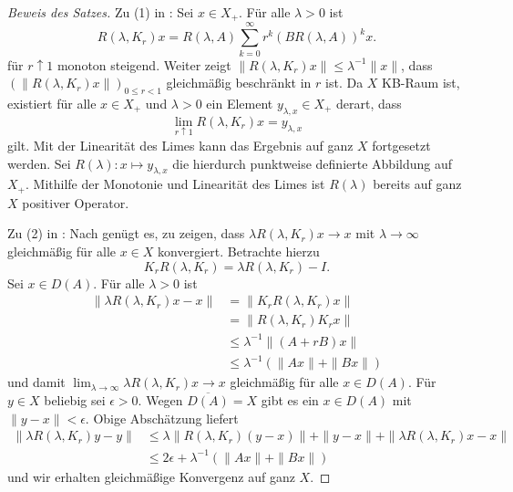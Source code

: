 \begin{proof}[Beweis des Satzes]
\par
Zu (1) in : Sei $x\in X_+$. Für alle  $\lambda >0$ ist
\begin{equation*}
R(\lambda, K_r)x=R(\lambda, A)\sum_{k=0}^\infty r^k (BR(\lambda, A))^kx.
\end{equation*}
für $r\uparrow 1$ monoton steigend. Weiter zeigt $\|R(\lambda, K_r)x\|\leq \lambda^{-1}\|x\|$, dass $(\|R(\lambda, K_r)x\|)_{0\leq r<1}$ gleichmäßig beschränkt in $r$ ist. Da $X$ KB-Raum ist, existiert für alle $x\in X_+$ und $\lambda >0$ ein Element $y_{\lambda, x}\in X_+$ derart, dass
\begin{equation}\label{Grenzwert der Resolventen}
\lim_{r\uparrow 1}R(\lambda, K_r)x = y_{\lambda, x}
\end{equation}
gilt. Mit der Linearität des Limes kann das Ergebnis auf ganz $X$ fortgesetzt werden. Sei $R(\lambda)\colon x\mapsto y_{\lambda,x}$ die hierdurch punktweise definierte Abbildung auf $X_+$. Mithilfe der Monotonie und Linearität des Limes ist $R(\lambda)$ bereits auf ganz $X$ positiver Operator.

\par
Zu (2) in : Nach  genügt es, zu zeigen, dass $\lambda R(\lambda, K_r)x\to x$ mit $\lambda\to\infty$ gleichmäßig für alle $x\in X$ konvergiert. Betrachte hierzu
\begin{equation*}
K_r R(\lambda, K_r)=\lambda R(\lambda, K_r)-I.
\end{equation*}
Sei $x\in D(A)$. Für alle $\lambda>0$ ist 
\begin{align*}
\|\lambda R(\lambda, K_r)x -x\|
&=\|K_r R(\lambda, K_r)x\|\\
&=\|R(\lambda, K_r)K_rx\|\\
&\leq \lambda^{-1}\|(A+rB)x\|\\
&\leq \lambda^{-1}(\|Ax\| + \|Bx\|)
\end{align*}
und damit   $\lim_{\lambda\to\infty}\lambda R(\lambda, K_r)x \to x$ gleichmäßig für alle $x\in D(A)$. Für $y\in X$ beliebig  sei $\epsilon >0$. Wegen $\overline{D(A)}= X$ gibt es ein $x\in D(A)$ mit $\|y - x\|< \epsilon$. Obige Abschätzung liefert 
\begin{align*}
\|\lambda R(\lambda, K_r)y - y\|
&\leq \lambda \|R(\lambda, K_r)(y-x)\| + \|y-x\| + \|\lambda R(\lambda, K_r)x -x\|\\
&\leq 2\epsilon + \lambda^{-1}(\|Ax\| + \|Bx\|)
\end{align*}
und wir erhalten gleichmäßige Konvergenz auf ganz $X$.


\end{proof}
